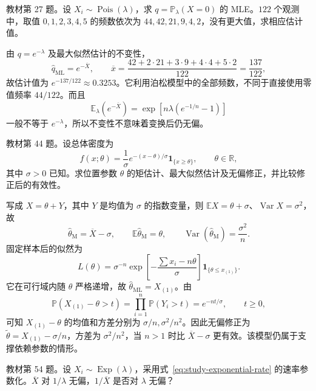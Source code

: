 \begin{example}
\label{ex:study-ch6-ex27}
教材第 27 题。设 $X_i\sim\operatorname{Pois}(\lambda)$，求 $q=\mathbb P_\lambda(X=0)$ 的 MLE。$122$ 个观测中，取值 $0,1,2,3,4,5$ 的频数依次为 $44,42,21,9,4,2$，没有更大值，求相应估计值。
\end{example}

\begin{solve}
由 $q=e^{-\lambda}$ 及最大似然估计的不变性，
\[
  \widehat q_{\mathrm{ML}}=e^{-\overline X},\qquad
  \overline x=\frac{42+2\cdot21+3\cdot9+4\cdot4+5\cdot2}{122}
     =\frac{137}{122},
\]
故估计值为 $e^{-137/122}\approx0.3253$。它利用泊松模型中的全部频数，不同于直接使用零值频率 $44/122$。而且
\[
  \mathbb E_\lambda(e^{-\overline X})
      =\exp\!\left[n\lambda(e^{-1/n}-1)\right]
\]
一般不等于 $e^{-\lambda}$，所以不变性不意味着变换后仍无偏。
\end{solve}

\begin{example}
\label{ex:study-ch6-ex44}
教材第 44 题。设总体密度为
\[
  f(x;\theta)=\frac1{\sigma}e^{-(x-\theta)/\sigma}
       \mathbf1_{\{x\ge\theta\}},
  \qquad\theta\in\mathbb R,
\]
其中 $\sigma>0$ 已知。求位置参数 $\theta$ 的矩估计、最大似然估计及无偏修正，并比较修正后的有效性。
\end{example}

\begin{solve}
写成 $X=\theta+Y$，其中 $Y$ 是均值为 $\sigma$ 的指数变量，则 $\mathbb E X=\theta+\sigma$、$\operatorname{Var}X=\sigma^2$，故
\[
  \widehat\theta_{\mathrm M}=\overline X-\sigma,\qquad
  \mathbb E\widehat\theta_{\mathrm M}=\theta,\qquad
  \operatorname{Var}(\widehat\theta_{\mathrm M})=\frac{\sigma^2}{n}.
\]
固定样本后的似然为
\[
  L(\theta)=\sigma^{-n}
     \exp\!\left[-\frac{\sum x_i-n\theta}{\sigma}\right]
     \mathbf1_{\{\theta\le x_{(1)}\}}.
\]
它在可行域内随 $\theta$ 严格递增，故 $\widehat\theta_{\mathrm{ML}}=X_{(1)}$。由
\[
  \mathbb P(X_{(1)}-\theta>t)
      =\prod_{i=1}^n\mathbb P(Y_i>t)
      =e^{-nt/\sigma},\qquad t\ge0,
\]
可知 $X_{(1)}-\theta$ 的均值和方差分别为 $\sigma/n,\sigma^2/n^2$。因此无偏修正为 $\widetilde\theta=X_{(1)}-\sigma/n$，方差为 $\sigma^2/n^2$，当 $n>1$ 时比 $\overline X-\sigma$ 更有效。该模型仍属于支撑依赖参数的情形。
\end{solve}

\begin{example}
\label{ex:study-ch6-ex54}
教材第 54 题。设 $X_i\sim\operatorname{Exp}(\lambda)$，采用式~\eqref{eq:study-exponential-rate} 的速率参数化。$\overline X$ 对 $1/\lambda$ 无偏，$1/\overline X$ 是否对 $\lambda$ 无偏？
\end{example}

